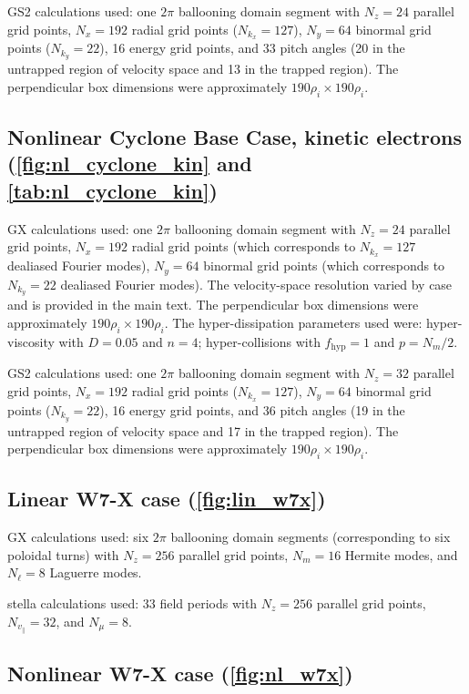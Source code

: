 \documentclass{jpp}
\newcommand{\GX}{{GX}\xspace}
\begin{document}
GS2 calculations used: one $2\pi$ ballooning domain segment with $N_z=24$ parallel grid points, $N_x=192$ radial grid points ($N_{k_x}=127$), $N_y=64$ binormal grid points ($N_{k_y}=22$), 16 energy grid points, and 33 pitch angles (20 in the untrapped region of velocity space and 13 in the trapped region). The perpendicular box dimensions were approximately $190\rho_i\times 190\rho_i$.

\subsection{Nonlinear Cyclone Base Case, kinetic electrons (\cref{fig:nl_cyclone_kin} and \cref{tab:nl_cyclone_kin})}\label{app:resolution_nl_cyclone_kin}

\GX calculations used: one $2\pi$ ballooning domain segment with $N_z=24$ parallel grid points, $N_x=192$ radial grid points (which corresponds to $N_{k_x}=127$ dealiased Fourier modes), $N_y=64$ binormal grid points (which corresponds to $N_{k_y}=22$ dealiased Fourier modes). The velocity-space resolution varied by case and is provided in the main text. The perpendicular box dimensions were approximately $190\rho_i\times 190\rho_i$. The hyper-dissipation parameters used were: hyper-viscosity with $D=0.05$ and $n=4$; hyper-collisions with $f_\mathrm{hyp}=1$ and $p=N_m/2$.

GS2 calculations used: one $2\pi$ ballooning domain segment with $N_z=32$ parallel grid points, $N_x=192$ radial grid points ($N_{k_x}=127$), $N_y=64$ binormal grid points ($N_{k_y}=22$), 16 energy grid points, and 36 pitch angles (19 in the untrapped region of velocity space and 17 in the trapped region). The perpendicular box dimensions were approximately $190\rho_i\times 190\rho_i$.

\subsection{Linear W7-X case (\cref{fig:lin_w7x})}

\GX calculations used: six $2\pi$ ballooning domain segments (corresponding to six poloidal turns) with $N_z=256$ parallel grid points, $N_m=16$ Hermite modes, and $N_\ell=8$ Laguerre modes.

stella calculations used: 33 field periods with $N_z=256$ parallel grid points, $N_{v_\parallel}=32$, and $N_\mu=8$.

\subsection{Nonlinear W7-X case (\cref{fig:nl_w7x})}
\end{document}
